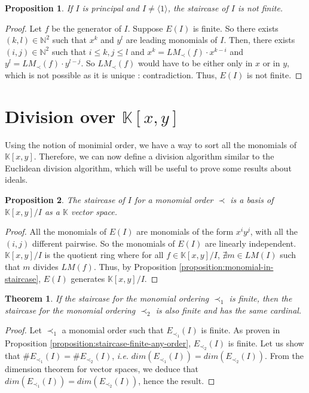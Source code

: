 \documentclass{article}
\newtheorem{theorem}{Theorem}[section]
\newtheorem{proposition}{Proposition}[section]
\begin{document}
\begin{proposition}
    If $I$ is principal and $I \neq \langle 1 \rangle$, the staircase of $I$ is not finite. 
\end{proposition}

\begin{proof}
    Let $f$ be the generator of $I$. Suppose $E(I)$ is finite. So there exists $(k, l) \in \mathbb{N}^{2}$ such that $x^{k}$ and $y^{l}$ are leading monomials of $I$. Then, there exists $(i, j) \in \mathbb{N}^{2}$ such that $i \leq k, j \leq l$ and $x^{k} = LM_{\prec}(f) \cdot x^{k - i}$ and $y^{l} = LM_{\prec}(f) \cdot y^{l - j}$. So $LM_{\prec}(f)$ would have to be either only in $x$ or in $y$, which is not possible as it is unique : contradiction. Thus, $E(I)$ is not finite. 
\end{proof}

\section{Division over $\mathbb{K}[x, y]$}

Using the notion of monimial order, we have a way to sort all the monomials of $\mathbb{K}[x, y]$. Therefore, we can now define a division algorithm similar to the Euclidean division algorithm, which will be useful to prove some results about ideals. 

\begin{proposition}
    The staircase of $I$ for a monomial order $\prec$ is a basis of $\mathbb{K}[x, y] / I$ as a $\mathbb{K}$ vector space.
\end{proposition}

\begin{proof}
    All the monomials of $E(I)$ are monomials of the form $x^{i}y^{j}$, with all the $(i, j)$ different pairwise. So the monomials of $E(I)$ are linearly independent. $\mathbb{K}[x,y] / I$ is the quotient ring where for all $f \in \mathbb{K}[x,y] / I$, $\nexists m \in LM(I)$ such that $m$ divides $LM(f)$. Thus, by Proposition \ref{proposition:monomial-in-staircase}, $E(I)$ generates $\mathbb{K}[x,y] / I$.
\end{proof}

\begin{theorem}
    If the staircase for the monomial ordering $\prec_{1}$ is finite, then the staircase for the monomial ordering $\prec_{2}$ is also finite and has the same cardinal.
\end{theorem}

\begin{proof}
    Let $\prec_{1}$ a monomial order such that $E_{\prec_{1}}(I)$ is finite. As proven in Proposition \ref{proposition:staircase-finite-any-order}, $E_{\prec_{2}}(I)$ is finite. Let us show that $\# E_{\prec_{1}}(I) = \# E_{\prec_{2}}(I)$, \textit{i.e.} $dim(E_{\prec_{1}}(I)) = dim(E_{\prec_{2}}(I))$. From the dimension theorem for vector spaces, we deduce that $dim(E_{\prec_{1}}(I)) = dim(E_{\prec_{2}}(I))$, hence the result.
\end{proof}
\end{document}
